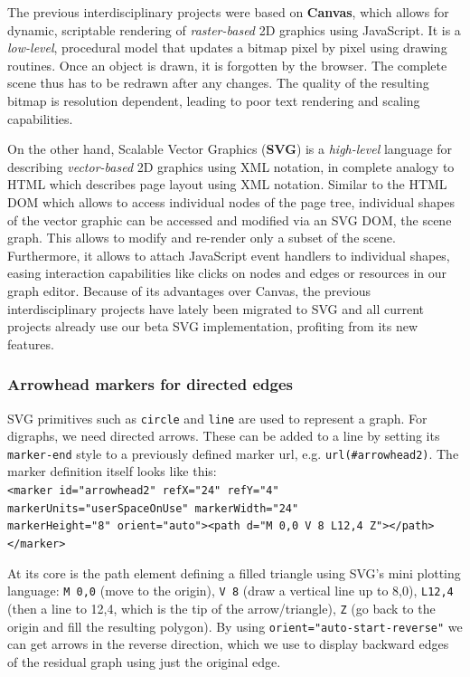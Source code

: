 The previous interdisciplinary projects were based on \textbf{Canvas}, which allows for dynamic, scriptable rendering of \textit{raster-based} 2D graphics using JavaScript. It is a \textit{low-level}, procedural model that updates a bitmap pixel by pixel using drawing routines. Once an object is drawn, it is forgotten by the browser. The complete scene thus has to be redrawn after any changes. The quality of the resulting bitmap is resolution dependent, leading to poor text rendering and scaling capabilities. 

On the other hand, Scalable Vector Graphics (\textbf{SVG}) is a \textit{high-level} language for describing \textit{vector-based} 2D graphics using XML notation, in complete analogy to HTML which describes page layout using XML notation. Similar to the HTML DOM which allows to access individual nodes of the page tree, individual shapes of the vector graphic can be accessed and modified via an SVG DOM, the scene graph. This allows to modify and re-render only a subset of the scene. Furthermore, it allows to attach JavaScript event handlers to individual shapes, easing interaction capabilities like clicks on nodes and edges or resources in our graph editor. Because of its advantages over Canvas, the previous interdisciplinary projects have lately been migrated to SVG \cite{feil2016idp} and all current projects \cite{feil2016idp,fischer2016idp} already use our beta SVG implementation, profiting from its new features.

\subsubsection{Arrowhead markers for directed edges}
SVG primitives such as \texttt{circle} and \texttt{line} are used to represent a graph. For digraphs, we need directed arrows. These can be added to a line by setting its \texttt{marker-end} style to a  previously defined marker url, e.g. \texttt{url(\#arrowhead2)}. The marker definition itself looks like this:\\
{\footnotesize{\texttt{<marker id="arrowhead2" refX="24" refY="4" markerUnits="userSpaceOnUse" markerWidth="24" \\ markerHeight="8" orient="auto"><path d="M 0,0 V 8 L12,4 Z"></path></marker>}}}

At its core is the path element defining a filled triangle using SVG's mini plotting language: \texttt{M 0,0} (move to the origin), \texttt{V 8} (draw a vertical line up to 8,0), \texttt{L12,4} (then a line to 12,4, which is the tip of the arrow/triangle), \texttt{Z} (go back to the origin and fill the resulting polygon). By using \texttt{orient="auto-start-reverse"} we can get arrows in the reverse direction, which we use to display backward edges of the residual graph using just the original edge.

